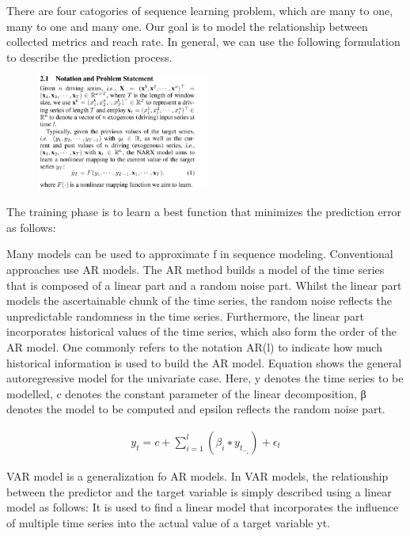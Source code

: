 \documentclass[5p]{elsarticle}
\newcommand{\dabiaolv}{reach rate}
\begin{document}
There are four catogories of sequence learning problem, which are many to one, many to one and many one. Our goal is to model the relationship between collected metrics and \dabiaolv. In general, we can use the following formulation to describe the prediction process.

\begin{figure}[h]
    \centering
    \includegraphics[width=0.5\textwidth]{notation_and_problem_statement.png}
    \caption{}
    \label{fig:notation_and_problem_statement}
\end{figure}

The training phase is to learn a best function that minimizes the prediction error as follows:
\begin{equation}
\end{equation}

Many models can be used to approximate f in sequence modeling. Conventional approaches use AR models. The AR method builds a model of the time series that is composed of a linear part and a random noise part. Whilst the linear part models the ascertainable chunk of the time series, the random noise reflects the unpredictable randomness in the time series. Furthermore, the linear part incorporates historical values of the time series, which also form the order of the AR model. One commonly refers to the notation AR(l) to indicate how much historical information is used to build the AR model. Equation shows the general autoregressive model for the univariate case. Here, y denotes the time series to be modelled, c denotes the constant parameter of the linear decomposition, β denotes the model to be computed and epsilon reflects the random noise part.

\begin{align}
    y_t = c+\sum_{i=1}^{l}(\beta_i ∗ y_t_−_i)+\epsilon_t
\end{align}


VAR model is a generalization fo AR models. In VAR models, the relationship between the predictor and the target variable is simply described using a linear model as follows: It is used to find a linear model that incorporates the influence of multiple time series into the actual value of a target variable yt.
\end{document}
